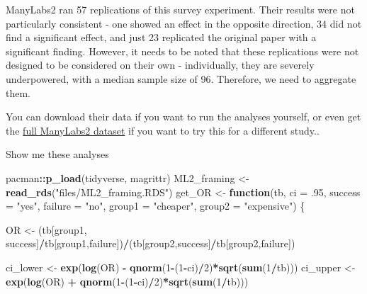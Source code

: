 \documentclass[
]{book}
\newenvironment{Shaded}{\begin{snugshade}}{\end{snugshade}}
\newcommand{\ControlFlowTok}[1]{\textcolor[rgb]{0.13,0.29,0.53}{\textbf{#1}}}
\newcommand{\DataTypeTok}[1]{\textcolor[rgb]{0.13,0.29,0.53}{#1}}
\newcommand{\DecValTok}[1]{\textcolor[rgb]{0.00,0.00,0.81}{#1}}
\newcommand{\FloatTok}[1]{\textcolor[rgb]{0.00,0.00,0.81}{#1}}
\newcommand{\KeywordTok}[1]{\textcolor[rgb]{0.13,0.29,0.53}{\textbf{#1}}}
\newcommand{\NormalTok}[1]{#1}
\newcommand{\OperatorTok}[1]{\textcolor[rgb]{0.81,0.36,0.00}{\textbf{#1}}}
\newcommand{\StringTok}[1]{\textcolor[rgb]{0.31,0.60,0.02}{#1}}
\begin{document}
ManyLabs2 ran 57 replications of this survey experiment. Their results were not particularly consistent - one showed an effect in the opposite direction, 34 did not find a significant effect, and just 23 replicated the original paper with a significant finding. However, it needs to be noted that these replications were not designed to be considered on their own - individually, they are severely underpowered, with a median sample size of 96. Therefore, we need to aggregate them.

You can download their data if you want to run the analyses yourself, or even get the \href{https://osf.io/fanre/}{full ManyLabs2 dataset} if you want to try this for a different study..

Show me these analyses

\begin{Shaded}
\begin{Highlighting}[]
\NormalTok{pacman}\OperatorTok{::}\KeywordTok{p_load}\NormalTok{(tidyverse, magrittr)}
\NormalTok{ML2_framing <-}\StringTok{ }\KeywordTok{read_rds}\NormalTok{(}\StringTok{"files/ML2_framing.RDS"}\NormalTok{)}
\NormalTok{get_OR <-}\StringTok{ }\ControlFlowTok{function}\NormalTok{(tb, }\DataTypeTok{ci =} \FloatTok{.95}\NormalTok{, }
                   \DataTypeTok{success =} \StringTok{"yes"}\NormalTok{, }\DataTypeTok{failure =} \StringTok{"no"}\NormalTok{, }
                   \DataTypeTok{group1 =} \StringTok{"cheaper"}\NormalTok{, }\DataTypeTok{group2 =} \StringTok{"expensive"}\NormalTok{) \{}

\NormalTok{  OR <-}\StringTok{ }\NormalTok{(tb[group1, success]}\OperatorTok{/}\NormalTok{tb[group1,failure])}\OperatorTok{/}\NormalTok{(tb[group2,success]}\OperatorTok{/}\NormalTok{tb[group2,failure])}

\NormalTok{  ci_lower <-}\StringTok{ }\KeywordTok{exp}\NormalTok{(}\KeywordTok{log}\NormalTok{(OR) }\OperatorTok{-}\StringTok{ }\KeywordTok{qnorm}\NormalTok{(}\DecValTok{1}\OperatorTok{-}\NormalTok{(}\DecValTok{1}\OperatorTok{-}\NormalTok{ci)}\OperatorTok{/}\DecValTok{2}\NormalTok{)}\OperatorTok{*}\KeywordTok{sqrt}\NormalTok{(}\KeywordTok{sum}\NormalTok{(}\DecValTok{1}\OperatorTok{/}\NormalTok{tb)))}
\NormalTok{  ci_upper <-}\StringTok{ }\KeywordTok{exp}\NormalTok{(}\KeywordTok{log}\NormalTok{(OR) }\OperatorTok{+}\StringTok{ }\KeywordTok{qnorm}\NormalTok{(}\DecValTok{1}\OperatorTok{-}\NormalTok{(}\DecValTok{1}\OperatorTok{-}\NormalTok{ci)}\OperatorTok{/}\DecValTok{2}\NormalTok{)}\OperatorTok{*}\KeywordTok{sqrt}\NormalTok{(}\KeywordTok{sum}\NormalTok{(}\DecValTok{1}\OperatorTok{/}\NormalTok{tb)))}


\end{Highlighting}
\end{Shaded}
\end{document}
